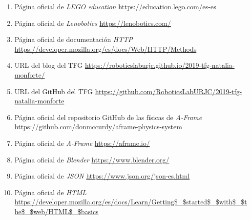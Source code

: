 \begin{enumerate}[1.]
\item Página oficial de \textit{LEGO education}\newline
\url{https://education.lego.com/es-es}\newline

\item Página oficial de \textit{Lenobotics}\newline
\url{https://lenobotics.com/}\newline

\item Página oficial de documentación \textit{HTTP}\newline
\url{https://developer.mozilla.org/es/docs/Web/HTTP/Methods}\newline

\item URL del blog del TFG\newline
\url{https://roboticslaburjc.github.io/2019-tfg-natalia-monforte/}\newline

\item URL del GitHub del TFG\newline
\url{https://github.com/RoboticsLabURJC/2019-tfg-natalia-monforte}\newline

\item Página oficial del repositorio GitHub de las físicas de \textit{A-Frame}\newline
\url{https://github.com/donmccurdy/aframe-physics-system}\newline

\item Página oficial de \textit{A-Frame}\newline
\url{https://aframe.io/}\newline

\item Página oficial de \textit{Blender}\newline
\url{https://www.blender.org/}\newline

\item Página oficial de \textit{JSON}\newline
\url{https://www.json.org/json-es.html}\newline

\item Página oficial de \textit{HTML}\newline
\url{https://developer.mozilla.org/es/docs/Learn/Getting$_$started$_$with$_$the$_$web/HTML$_$basics}\newline


\end{enumerate}
